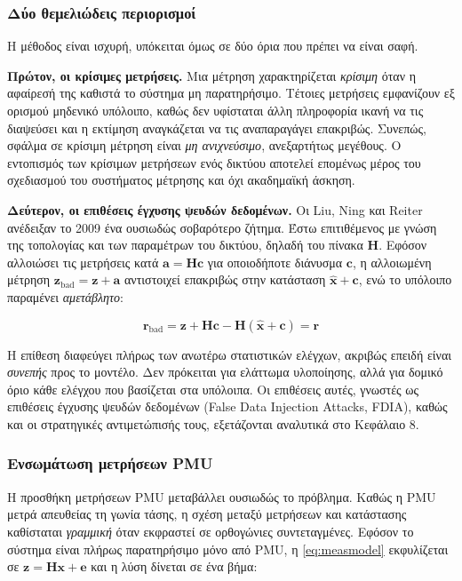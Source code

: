 \subsubsection*{Δύο θεμελιώδεις περιορισμοί}

Η μέθοδος είναι ισχυρή, υπόκειται όμως σε δύο όρια που πρέπει να είναι σαφή.

\textbf{Πρώτον, οι κρίσιμες μετρήσεις.} Μια μέτρηση χαρακτηρίζεται \emph{κρίσιμη} όταν η
αφαίρεσή της καθιστά το σύστημα μη παρατηρήσιμο. Τέτοιες μετρήσεις εμφανίζουν εξ ορισμού
μηδενικό υπόλοιπο, καθώς δεν υφίσταται άλλη πληροφορία ικανή να τις διαψεύσει και η
εκτίμηση αναγκάζεται να τις αναπαραγάγει επακριβώς. Συνεπώς, σφάλμα σε κρίσιμη μέτρηση
είναι \emph{μη ανιχνεύσιμο}, ανεξαρτήτως μεγέθους. Ο εντοπισμός των κρίσιμων μετρήσεων ενός
δικτύου αποτελεί επομένως μέρος του σχεδιασμού του συστήματος μέτρησης και όχι ακαδημαϊκή
άσκηση.

\textbf{Δεύτερον, οι επιθέσεις έγχυσης ψευδών δεδομένων.} Οι Liu, Ning και Reiter ανέδειξαν
το 2009 ένα ουσιωδώς σοβαρότερο ζήτημα. Έστω επιτιθέμενος με γνώση της τοπολογίας και των
παραμέτρων του δικτύου, δηλαδή του πίνακα $\mathbf{H}$. Εφόσον αλλοιώσει τις μετρήσεις κατά
$\mathbf{a} = \mathbf{H}\mathbf{c}$ για οποιοδήποτε διάνυσμα $\mathbf{c}$, η αλλοιωμένη
μέτρηση $\mathbf{z}_{\text{bad}} = \mathbf{z} + \mathbf{a}$ αντιστοιχεί επακριβώς στην
κατάσταση $\hat{\mathbf{x}} + \mathbf{c}$, ενώ το υπόλοιπο παραμένει \emph{αμετάβλητο}:

\begin{equation}
\mathbf{r}_{\text{bad}} = \mathbf{z} + \mathbf{H}\mathbf{c}
        - \mathbf{H}(\hat{\mathbf{x}} + \mathbf{c}) = \mathbf{r}
\label{eq:fdia}
\end{equation}

Η επίθεση διαφεύγει πλήρως των ανωτέρω στατιστικών ελέγχων, ακριβώς επειδή είναι
\emph{συνεπής} προς το μοντέλο. Δεν πρόκειται για ελάττωμα υλοποίησης, αλλά για δομικό όριο
κάθε ελέγχου που βασίζεται στα υπόλοιπα. Οι επιθέσεις αυτές, γνωστές ως επιθέσεις έγχυσης
ψευδών δεδομένων (False Data Injection Attacks, FDIA), καθώς και οι στρατηγικές
αντιμετώπισής τους, εξετάζονται αναλυτικά στο Κεφάλαιο 8.

\subsubsection*{Ενσωμάτωση μετρήσεων PMU}

Η προσθήκη μετρήσεων PMU μεταβάλλει ουσιωδώς το πρόβλημα. Καθώς η PMU μετρά απευθείας τη
γωνία τάσης, η σχέση μεταξύ μετρήσεων και κατάστασης καθίσταται \emph{γραμμική} όταν
εκφραστεί σε ορθογώνιες συντεταγμένες. Εφόσον το σύστημα είναι πλήρως παρατηρήσιμο μόνο
από PMU, η \eqref{eq:measmodel} εκφυλίζεται σε
$\mathbf{z} = \mathbf{H}\mathbf{x} + \mathbf{e}$ και η λύση δίνεται σε ένα βήμα:

